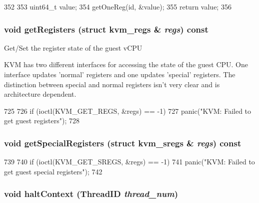 \begin{DoxyCode}
352                                              {
353         uint64_t value;
354         getOneReg(id, &value);
355         return value;
356     }
\end{DoxyCode}
\hypertarget{classBaseKvmCPU_a422ac5896dab3bae0379fa65831e3778}{
\subsubsection[{getRegisters}]{\setlength{\rightskip}{0pt plus 5cm}void getRegisters (struct kvm\_\-regs \& {\em regs}) const}}
\label{classBaseKvmCPU_a422ac5896dab3bae0379fa65831e3778}
Get/Set the register state of the guest vCPU

KVM has two different interfaces for accessing the state of the guest CPU. One interface updates 'normal' registers and one updates 'special' registers. The distinction between special and normal registers isn't very clear and is architecture dependent. 


\begin{DoxyCode}
725 {
726     if (ioctl(KVM_GET_REGS, &regs) == -1)
727         panic("KVM: Failed to get guest registers\n");
728 }
\end{DoxyCode}
\hypertarget{classBaseKvmCPU_a5b5f3c0a541efb9b8567a5e835421c15}{
\subsubsection[{getSpecialRegisters}]{\setlength{\rightskip}{0pt plus 5cm}void getSpecialRegisters (struct kvm\_\-sregs \& {\em regs}) const}}
\label{classBaseKvmCPU_a5b5f3c0a541efb9b8567a5e835421c15}



\begin{DoxyCode}
739 {
740     if (ioctl(KVM_GET_SREGS, &regs) == -1)
741         panic("KVM: Failed to get guest special registers\n");
742 }
\end{DoxyCode}
\hypertarget{classBaseKvmCPU_ab39525f324a8a93139e17327f6ccde10}{
\subsubsection[{haltContext}]{\setlength{\rightskip}{0pt plus 5cm}void haltContext ({\bf ThreadID} {\em thread\_\-num})}}
\label{classBaseKvmCPU_ab39525f324a8a93139e17327f6ccde10}



